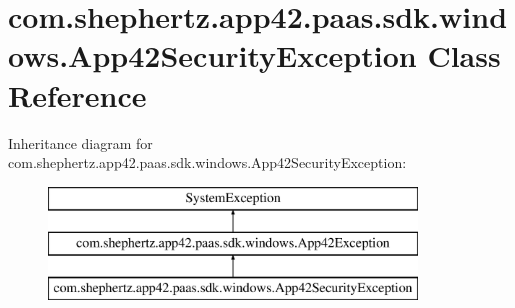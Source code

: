 \hypertarget{classcom_1_1shephertz_1_1app42_1_1paas_1_1sdk_1_1windows_1_1_app42_security_exception}{\section{com.\+shephertz.\+app42.\+paas.\+sdk.\+windows.\+App42\+Security\+Exception Class Reference}
\label{classcom_1_1shephertz_1_1app42_1_1paas_1_1sdk_1_1windows_1_1_app42_security_exception}
}
Inheritance diagram for com.\+shephertz.\+app42.\+paas.\+sdk.\+windows.\+App42\+Security\+Exception\+:\begin{figure}[H]
\begin{center}
\leavevmode
\includegraphics[height=3.000000cm]{classcom_1_1shephertz_1_1app42_1_1paas_1_1sdk_1_1windows_1_1_app42_security_exception}
\end{center}
\end{figure}
